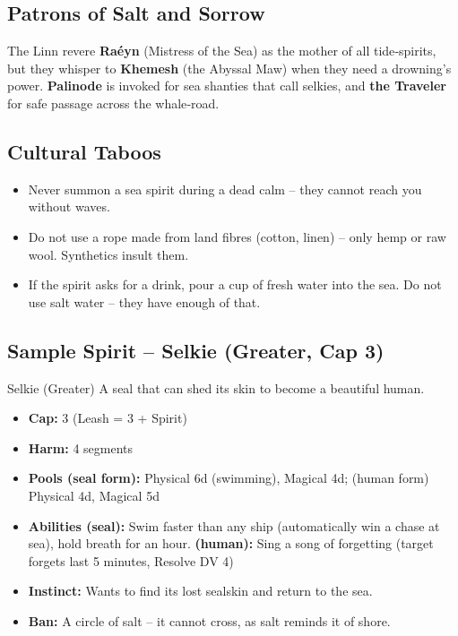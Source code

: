\documentclass[10pt,a5paper]{book}
\begin{document}
\subsection*{Patrons of Salt and Sorrow}
The Linn revere \textbf{Raéyn} (Mistress of the Sea) as the mother of all tide‑spirits, but they whisper to \textbf{Khemesh} (the Abyssal Maw) when they need a drowning’s power. \textbf{Palinode} is invoked for sea shanties that call selkies, and \textbf{the Traveler} for safe passage across the whale‑road.

\subsection*{Cultural Taboos}
\begin{itemize}
    \item Never summon a sea spirit during a dead calm – they cannot reach you without waves.
    \item Do not use a rope made from land fibres (cotton, linen) – only hemp or raw wool. Synthetics insult them.
    \item If the spirit asks for a drink, pour a cup of fresh water into the sea. Do not use salt water – they have enough of that.
\end{itemize}

\subsection*{Sample Spirit – Selkie (Greater, Cap 3)}
\begin{spiritcard}{Selkie (Greater)}
A seal that can shed its skin to become a beautiful human.
\begin{itemize}
    \item \textbf{Cap:} 3 (Leash = 3 + Spirit)
    \item \textbf{Harm:} 4 segments
    \item \textbf{Pools (seal form):} Physical 6d (swimming), Magical 4d; (human form) Physical 4d, Magical 5d
    \item \textbf{Abilities (seal):} Swim faster than any ship (automatically win a chase at sea), hold breath for an hour. \textbf{(human):} Sing a song of forgetting (target forgets last 5 minutes, Resolve DV 4)
    \item \textbf{Instinct:} Wants to find its lost sealskin and return to the sea.
    \item \textbf{Ban:} A circle of salt – it cannot cross, as salt reminds it of shore.
\end{itemize}
\end{spiritcard}
\end{document}
